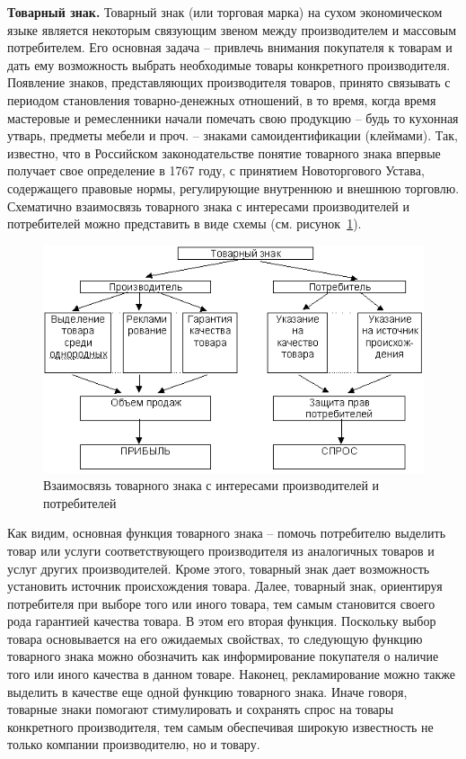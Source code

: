  \textbf{Товарный знак.} Товарный знак (или торговая марка) на сухом
  экономическом языке является некоторым связующим звеном между производителем
  и массовым потребителем. Его основная задача -- привлечь внимания покупателя к
  товарам и дать ему возможность выбрать необходимые товары конкретного
  производителя. Появление знаков, представляющих производителя товаров,
  принято связывать с периодом становления товарно-денежных отношений, в то
  время, когда время мастеровые и ремесленники начали помечать свою продукцию --
  будь то кухонная утварь, предметы мебели и проч. -- знаками
  самоидентификации (клеймами). Так, известно, что в Российском законодательстве
  понятие товарного знака впервые получает свое определение  в 1767 году,
  с принятием Новоторгового Устава, содержащего правовые нормы,
  регулирующие внутреннюю и внешнюю торговлю\autocite{pantuhinaAM}.
  Схематично взаимосвязь товарного знака с интересами производителей и
  потребителей можно представить в виде схемы (см. рисунок~\ref{fig:pantuhina}).
  \begin{figure}[h!]
  \centering
  \includegraphics[width=.7\linewidth]{images/pantuhina}
  \caption{Взаимосвязь товарного знака с интересами производителей и потребителей}
  \label{fig:pantuhina}
\end{figure}

  Как видим, основная функция товарного знака -- помочь потребителю выделить
  товар или услуги соответствующего производителя из аналогичных товаров и услуг
  других производителей. Кроме этого, товарный знак дает возможность установить
  источник происхождения товара. Далее, товарный знак, ориентируя потребителя
  при выборе того или иного товара, тем самым становится своего рода гарантией
  качества товара. В этом его вторая функция. Поскольку выбор товара основывается
  на его ожидаемых свойствах, то следующую функцию товарного знака можно обозначить
  как информирование покупателя о наличие того или иного качества в данном товаре.
  Наконец, рекламирование можно также выделить в качестве еще одной функцию
  товарного знака. Иначе говоря, товарные знаки помогают стимулировать и
  сохранять спрос на товары конкретного производителя, тем самым обеспечивая
  широкую известность не только компании производителю, но и товару.

